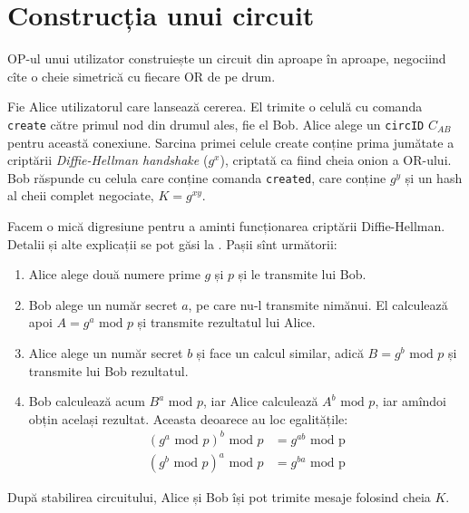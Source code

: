 
\section{Construcția unui circuit}

\indent\indent OP-ul unui utilizator construiește un circuit din aproape
în aproape, negociind cîte o cheie simetrică cu fiecare OR de pe drum.

Fie Alice utilizatorul care lansează cererea. El trimite o celulă cu
comanda \texttt{create} către primul nod din drumul ales, fie el Bob.
Alice alege un \texttt{circID} $C_{AB}$ pentru această conexiune.
Sarcina primei celule create conține prima jumătate a criptării
\emph{Diffie-Hellman handshake} ($g^x$), criptată ca fiind cheia onion
a OR-ului. Bob răspunde cu celula care conține comanda \texttt{created},
care conține $ g^y $ și un hash al cheii complet negociate, $ K = g^{xy} $.

\vspace{1cm}
Facem o mică digresiune pentru a aminti funcționarea criptării Diffie-Hellman.
Detalii și alte explicații se pot găsi la \cite{dhse}.
Pașii sînt următorii:
\begin{enumerate}[(1)]
  \item Alice alege două numere prime $ g $ și $ p $ și le transmite lui Bob.
  \item Bob alege un număr secret $ a $, pe care nu-l transmite nimănui.
    El calculează apoi $ A = g^a \text{ mod } p $ și transmite rezultatul lui Alice.
  \item Alice alege un număr secret $ b $ și face un calcul similar,
    adică $ B = g^b \text{ mod } p $ și transmite lui Bob rezultatul.
  \item Bob calculează acum $ B^a \text{ mod } p $, iar Alice calculează
    $ A^b \text{ mod } p $, iar amîndoi obțin a\-ce\-lași rezultat.
    Aceasta deoarece au loc egalitățile:
    \begin{align*}
      (g^a \text{ mod } p)^b \text{ mod } p &= g^{ab} \text{ mod p} \\
      (g^b \text{ mod } p)^a \text{ mod } p &= g^{ba} \text{ mod p}
    \end{align*}
\end{enumerate}
\vspace{1cm}

După stabilirea circuitului, Alice și Bob își pot trimite mesaje folosind
cheia $ K $.

